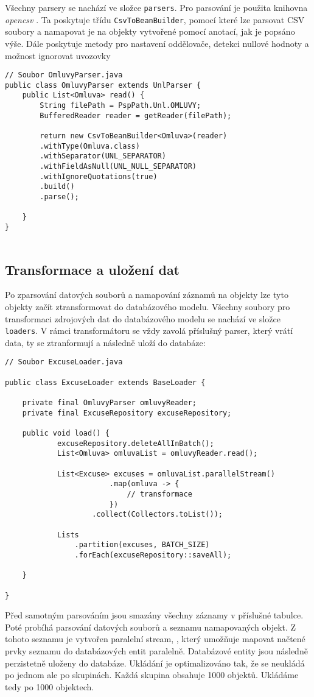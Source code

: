 \noindent Všechny parsery se nachází ve složce \lstinline|parsers|. Pro parsování je použita knihovna \textit{opencsv} \cite{opencsv}. Ta poskytuje třídu \lstinline|CsvToBeanBuilder|, pomocí které lze parsovat CSV soubory a namapovat je na objekty vytvořené pomocí anotací, jak je popsáno výše. Dále poskytuje metody pro nastavení oddělovače, detekci nullové hodnoty a možnost ignorovat uvozovky

\begin{lstlisting}[caption={Parsování datového souboru omluvy.unl}, tabsize=2]
// Soubor OmluvyParser.java
public class OmluvyParser extends UnlParser {
	public List<Omluva> read() {
		String filePath = PspPath.Unl.OMLUVY;
		BufferedReader reader = getReader(filePath);
		
		return new CsvToBeanBuilder<Omluva>(reader)
		.withType(Omluva.class)
		.withSeparator(UNL_SEPARATOR)
		.withFieldAsNull(UNL_NULL_SEPARATOR)
		.withIgnoreQuotations(true)
		.build()
		.parse();
		
	}
}
	
\end{lstlisting}

\subsection*{Transformace a uložení dat}
Po zparsování datových souborů a namapování záznamů na objekty lze tyto objekty začít ztransformovat do databázového modelu. Všechny soubory pro transformaci zdrojových dat do databázového modelu se nachází ve složce \lstinline|loaders|. V rámci transformátoru se vždy zavolá příslušný parser, který vrátí data, ty se ztranformují a následně uloží do databáze:

\begin{lstlisting}[caption={Transformace objektu Omluva na databázový objekt Excuse}, tabsize=2]
// Soubor ExcuseLoader.java
	
public class ExcuseLoader extends BaseLoader {

    private final OmluvyParser omluvyReader;
    private final ExcuseRepository excuseRepository;

    public void load() {
			excuseRepository.deleteAllInBatch();
			List<Omluva> omluvaList = omluvyReader.read();
			
			List<Excuse> excuses = omluvaList.parallelStream()
						.map(omluva -> {
							// transformace
						})
					.collect(Collectors.toList());
				
			Lists
				.partition(excuses, BATCH_SIZE)
				.forEach(excuseRepository::saveAll);

	}

}
\end{lstlisting}

\noindent 
Před samotným parsováním jsou smazány všechny záznamy v příslušné tabulce. Poté probíhá parsování datových souborů a seznamu namapovaných objekt. Z tohoto seznamu je vytvořen paralelní stream, , který umožňuje mapovat načtené prvky seznamu do databázových entit paralelně. Databázové entity jsou následně perzistetně uloženy do databáze. Ukládání je optimalizováno tak, že se neukládá po jednom ale po skupinách. Každá skupina obsahuje 1000 objektů. Ukládáme tedy po 1000 objektech.

